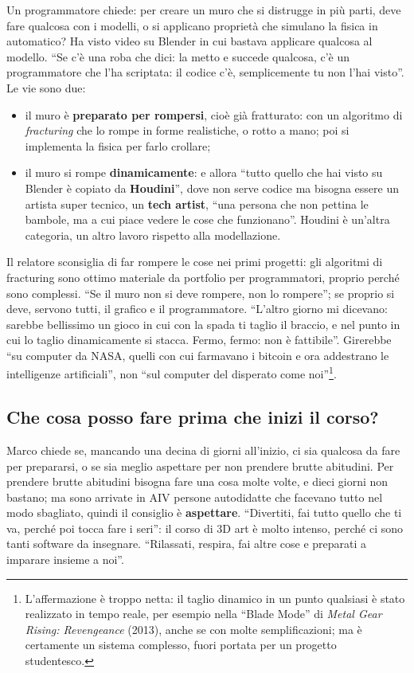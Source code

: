 Un programmatore chiede: per creare un muro che si distrugge in più parti, deve
fare qualcosa con i modelli, o si applicano proprietà che simulano la fisica in
automatico? Ha visto video su Blender in cui bastava applicare qualcosa al
modello. ``Se c'è una roba che dici: la metto e succede qualcosa, c'è un
programmatore che l'ha scriptata: il codice c'è, semplicemente tu non l'hai
visto''. Le vie sono due:
\begin{itemize}
  \item il muro è \textbf{preparato per rompersi}, cioè già fratturato: con un
        algoritmo di \emph{fracturing} che lo rompe in forme realistiche, o
        rotto a mano; poi si implementa la fisica per farlo crollare;
  \item il muro si rompe \textbf{dinamicamente}: e allora ``tutto quello che
        hai visto su Blender è copiato da \textbf{Houdini}'', dove non serve
        codice ma bisogna essere un artista super tecnico, un \textbf{tech
        artist}, ``una persona che non pettina le bambole, ma a cui piace vedere
        le cose che funzionano''. Houdini è un'altra categoria, un altro lavoro
        rispetto alla modellazione.
\end{itemize}
Il relatore sconsiglia di far rompere le cose nei primi progetti: gli algoritmi
di fracturing sono ottimo materiale da portfolio per programmatori, proprio
perché sono complessi. ``Se il muro non si deve rompere, non lo rompere''; se
proprio si deve, servono tutti, il grafico e il programmatore. ``L'altro giorno
mi dicevano: sarebbe bellissimo un gioco in cui con la spada ti taglio il
braccio, e nel punto in cui lo taglio dinamicamente si stacca. Fermo, fermo: non
è fattibile''. Girerebbe ``su computer da NASA, quelli con cui farmavano i
bitcoin e ora addestrano le intelligenze artificiali'', non ``sul computer del
disperato come noi''\footnote{L'affermazione è troppo netta: il taglio dinamico
in un punto qualsiasi è stato realizzato in tempo reale, per esempio nella
``Blade Mode'' di \emph{Metal Gear Rising: Revengeance} (2013), anche se con
molte semplificazioni; ma è certamente un sistema complesso, fuori portata per
un progetto studentesco.}.

\subsection{Che cosa posso fare prima che inizi il corso?}

Marco chiede se, mancando una decina di giorni all'inizio, ci sia qualcosa da
fare per prepararsi, o se sia meglio aspettare per non prendere brutte
abitudini. Per prendere brutte abitudini bisogna fare una cosa molte volte, e
dieci giorni non bastano; ma sono arrivate in AIV persone autodidatte che
facevano tutto nel modo sbagliato, quindi il consiglio è \textbf{aspettare}.
``Divertiti, fai tutto quello che ti va, perché poi tocca fare i seri'': il
corso di 3D art è molto intenso, perché ci sono tanti software da insegnare.
``Rilassati, respira, fai altre cose e preparati a imparare insieme a noi''.

